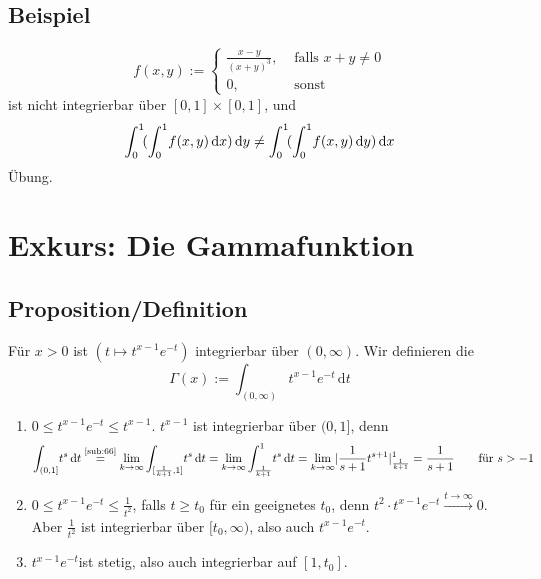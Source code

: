 \subsection[Beispiel: Anwendung von Fubini]{Beispiel} %
\label{sub:75}
\[
	f(x,y) := \begin{cases}
		\frac{x-y}{(x+y)^3} , &\text{ falls }x+y\not= 0\\
		0 ,&\text{ sonst } 
	\end{cases}
\]
ist nicht integrierbar über $[0,1] \times [0,1]$, und 
\[
	\int_{0} ^{1} \! ( \int_{0} ^{1} \! f(x,y)  \, \mathrm{d}x )  \, \mathrm{d}y \not= \int_{0} ^{1} \! (\int_{0} ^{1} \! f(x,y)  \, \mathrm{d}y)  \, \mathrm{d}x   
\]
Übung.

\section*{Exkurs: Die Gammafunktion} %
\label{sec:exkurs_die_gammafunktion}


\subsection[Proposition/Definition: Die Gamma-Funktion]{Proposition/Definition} %
\label{sub:76}
Für $x>0$ ist $(t \mapsto t^{x-1} e^{-t})$ integrierbar über $(0,\infty)$. Wir definieren die  
\[
	\Gamma(x) := \int_{(0,\infty)} \! t^{x-1} e^{-t}  \, \mathrm{d}t
\]
\begin{enumerate}[1.]
	\item $0 \le t^{x-1} e^{-t}\le t^{x-1}$. $t^{x-1}$ ist integrierbar über $(0,1]$, denn 
	\[
		\int_{(0,1]}\! t^s  \, \mathrm{d}t \stackrel{\text{\ref{sub:66}}}{=} \lim_{ k \to \infty} \int_{[\frac{1}{k+1},1 ]} \! t^s  \, \mathrm{d}t
		= \lim_{ k \to \infty} \int_{\frac{1}{k+1} } ^{1} \! t^s  \, \mathrm{d}t = \lim_{ k \to \infty}  \lvert\frac{1}{s+1} t^{s+1} \rvert_{\frac{1}{k+1} }^{1}
		= \frac{1}{s+1} \tag*{für $s>-1$}  
	\]
	\item $0\le t^{x-1} e^{-t} \le \frac{1}{t^2} $, falls $t\ge t_0$ für ein geeignetes $t_0$, denn $t^2 \cdot t^{x-1} e^{-t} \xrightarrow{t \to \infty} 0$. Aber 
	$\frac{1}{t^2} $ ist integrierbar über $[t_0, \infty)$, also auch $t^{x-1} e^{-t}$.
	\item $t^{x-1} e^{-t}$ist stetig, also auch integrierbar auf $[1,t_0]$. \bewende
\end{enumerate}

